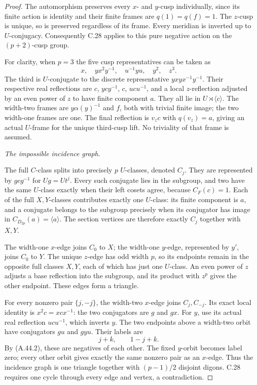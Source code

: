 \begin{proof}
The automorphism preserves every \(x\)- and
\(y\)-cusp individually, since its finite action
is identity and their finite frames are
\(q(1)=q(f)=1\). The \(z\)-cusp is unique,
so is preserved regardless of its frame. Every
meridian is inverted up to \(U\)-conjugacy.
Consequently C.28 applies to this pure negative
action on the \((p+2)\)-cusp group.

For clarity, when \(p=3\) the five cusp
representatives can be taken as
\[
        x,\quad yx^2y^{-1},\quad u^{-1}yu,\quad y^2,\quad z^3.
 \tag{A.44.4}
\]
The third is \(U\)-conjugate to the discrete
representative \(yxyx^{-1}y^{-1}\). Their
respective real reflections are \(c\),
\(ycy^{-1}\), \(c\), \(ucu^{-1}\), and
a local \(z\)-reflection adjusted by an even
power of \(z\) to have finite component \(a\).
They all lie in \(U\rtimes\langle c\rangle\).
The width-two frames are
\(y\alpha(y)^{-1}\) and \(f\), both with
trivial finite image; the two width-one frames
are one. The final reflection is \(v_zc\)
with \(q(v_z)=a\), giving an actual \(U\)-frame
for the unique third-cusp lift. No triviality
of that frame is assumed.

\emph{The impossible incidence graph.}\par
The full \(C\)-class splits into precisely
\(p\) \(U\)-classes, denoted \(C_j\).
They are represented by \(gcg^{-1}\) for
\(Ug=Ut^j\). Every such conjugate lies in
the subgroup, and two have the same
\(U\)-class exactly when their left cosets
agree, because \(C_F(c)=1\).
Each of the full \(X,Y\)-classes contributes
exactly one \(U\)-class: its finite component
is \(a\), and a conjugate belongs to the
subgroup precisely when its conjugator has
image in \(C_{D_{2p}}(a)=\langle a\rangle\).
The section vertices are therefore exactly
\(C_j\) together with \(X,Y\).

The width-one \(x\)-edge joins \(C_0\) to
\(X\); the width-one \(y\)-edge, represented
by \(y'\), joins \(C_0\) to \(Y\).
The unique \(z\)-edge has odd width \(p\),
so its endpoints remain in the opposite full
classes \(X,Y\), each of which has just one
\(U\)-class. An even power of \(z\) adjusts
a base reflection into the subgroup, and its
product with \(z^p\) gives the other endpoint.
These edges form a triangle.

For every nonzero pair \(\{j,-j\}\), the
width-two \(x\)-edge joins \(C_j,C_{-j}\).
Its exact local identity is
\(x^2c=xcx^{-1}\): the two conjugators are
\(g\) and \(gx\). For \(y\), use its
actual real reflection \(ucu^{-1}\), which
inverts \(y\). The two endpoints above a
width-two orbit have conjugators \(gu\)
and \(gyu\). Their labels are
\[
                         j+k,\qquad 1-j+k.
\]
By (A.44.2), these are negatives of each other.
The fixed \(y\)-orbit becomes label zero;
every other orbit gives exactly the same
nonzero pair as an \(x\)-edge. Thus the
incidence graph is one triangle together with
\((p-1)/2\) disjoint digons. C.28 requires
one cycle through every edge and vertex, a
contradiction.


\end{proof}
